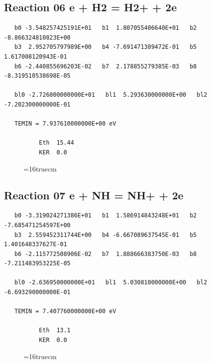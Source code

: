 \documentclass[12pt,dvipdfm]{article}
\begin{document}
\subsection{
Reaction 06 e + H2 = H2+ + 2e }
\begin{small}\begin{verbatim}
   b0 -3.548257425191E+01   b1  1.807055406640E+01   b2 -8.866324810823E+00
   b3  2.952705797989E+00   b4 -7.691471389472E-01   b5  1.617008120943E-01
   b6 -2.440855696203E-02   b7  2.178855279385E-03   b8 -8.319510538698E-05

   bl0 -2.726000000000E+01   bl1  5.293630000000E+00   bl2 -7.202300000000E-01

   TEMIN = 7.937610000000E+00 eV

          Eth  15.44
          KER  0.0
\end{verbatim}\end{small}
\begin{figure}[h!] \label{n2rates}
\epsfxsize=16truecm
\end{figure}
\newpage

\subsection{
Reaction 07 e + NH = NH+ + 2e }
\begin{small}\begin{verbatim}
   b0 -3.319024271386E+01   b1  1.586914843248E+01   b2 -7.685471254597E+00
   b3  2.559452311744E+00   b4 -6.667089637545E-01   b5  1.401648337627E-01
   b6 -2.115772508906E-02   b7  1.888666383750E-03   b8 -7.211483953225E-05

   bl0 -2.636950000000E+01   bl1  5.030810000000E+00   bl2 -6.693290000000E-01

   TEMIN = 7.407760000000E+00 eV

          Eth  13.1
          KER  0.0

\end{verbatim}\end{small}
\begin{figure}[h!] \label{n2rates}
\epsfxsize=16truecm
\end{figure}
\newpage
\end{document}
